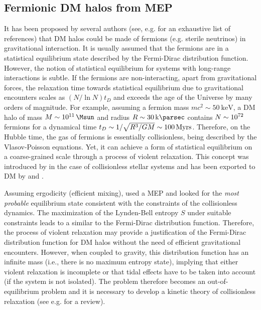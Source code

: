 \subsection{Fermionic DM halos from MEP}
\label{sec:model:rar}

It has been proposed by several authors (see, e.g. \citealp{2020EPJP..135..290C} for an exhaustive list of references) that DM halos could be made of fermions (e.g. sterile neutrinos) in gravitational interaction. It is usually assumed that the fermions are in a statistical equilibrium state described by the Fermi-Dirac distribution function. However, the notion of statistical equilibrium for systems with long-range interactions is subtle. If the fermions are non-interacting, apart from gravitational forces, the relaxation time towards statistical equilibrium due to gravitational encounters scales as $(N/\ln N)t_D$ \citep[see e.g.][]{Binney2008} and exceeds the age of the Universe by many orders of magnitude. For example, assuming a fermion mass $m c^2 \sim \SI{50}{\kilo\eV}$, a DM halo of mass $M\sim \SI{E11}{\Msun}$ and radius $R \sim \SI{30}{\kilo\parsec}$ contains $N\sim \num{E72}$ fermions for a dynamical time $t_D\sim 1/\sqrt{R^3/G M}\sim 100\, {\rm Myrs}$. Therefore, on the Hubble time, the gas of fermions is essentially collisionless, being described by the Vlasov-Poisson equations. Yet, it can achieve a form of statistical equilibrium on a coarse-grained scale through a process of violent relaxation. This concept was introduced  by \cite{1967MNRAS.136..101L} in the case of collisionless stellar systems and has been exported to DM by \citet{1996ApJ...466L...1K} and \citet{2015PhRvD..92l3527C}. 

Assuming ergodicity (efficient mixing), \citet{1967MNRAS.136..101L} used a MEP and looked for the {\it most probable} equilibrium state consistent with the constraints of the collisionless dynamics. The maximization of the Lynden-Bell entropy $S$ under suitable constraints leads to a  similar to the Fermi-Dirac distribution function. Therefore, the process of violent relaxation may provide a justification of the Fermi-Dirac distribution function for DM halos without the need of efficient gravitational encounters. However, when coupled to gravity, this distribution function has an infinite mass (i.e., there is no maximum entropy state), implying that either violent relaxation is incomplete or that tidal effects have to be taken into account (if the system is not isolated). The problem therefore becomes an out-of-equilibrium problem and it is necessary to develop a kinetic theory of collisionless relaxation (see e.g. \citealp{2021arXiv211213664C} for a review).

